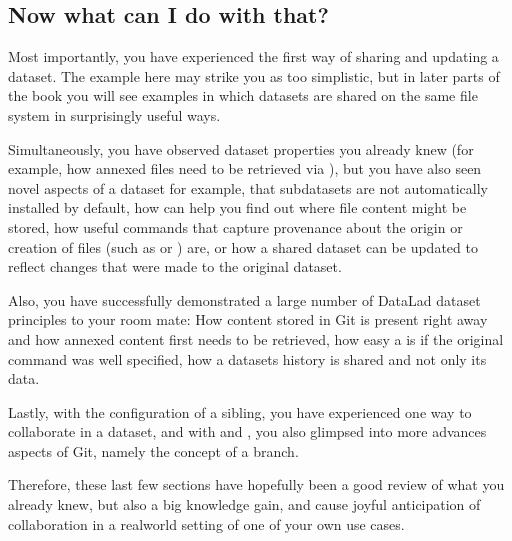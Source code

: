 \subsection{Now what can I do with that?}
\label{\detokenize{basics/101-120-summary:now-what-can-i-do-with-that}}
\sphinxAtStartPar
Most importantly, you have experienced the first way of sharing
and updating a dataset.
The example here may strike you as too simplistic, but in later parts of
the book you will see examples in which datasets are shared on the same
file system in surprisingly useful ways.

\sphinxAtStartPar
Simultaneously, you have observed dataset properties you already knew
(for example, how annexed files need to be retrieved via ),
but you have also seen novel aspects of a dataset \textendash{} for example, that
subdatasets are not automatically installed by default, how
 can help you find out where file content might be stored,
how useful commands that capture provenance about the origin or creation of files
(such as  or ) are,
or how a shared dataset can be updated to reflect changes that were made
to the original dataset.

\sphinxAtStartPar
Also, you have successfully demonstrated a large number of DataLad dataset
principles to your room mate: How content stored in Git is present right
away and how annexed content first needs to be retrieved, how easy a
 is if the original  command was well
specified, how a datasets history is shared and not only its data.

\sphinxAtStartPar
Lastly, with the configuration of a sibling, you have experienced one
way to collaborate in a dataset, and with 
and , you also glimpsed into more advances aspects
of Git, namely the concept of a branch.

\sphinxAtStartPar
Therefore, these last few sections have hopefully been a good review
of what you already knew, but also a big knowledge gain, and cause
joyful anticipation of collaboration in a real\sphinxhyphen{}world setting of one
of your own use cases.

\sphinxstepscope


